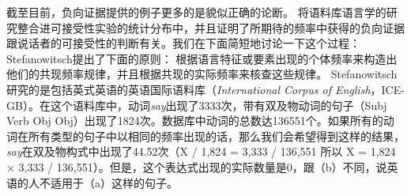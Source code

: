 截至目前，负向证据提供的例子更多的是貌似正确的论断。
\citet{Stefanowitsch2008a}将语料库语言学的研究整合进可接受性实验的统计分布中，并且证明了所期待的频率中获得的负向证据跟说话者的可接受性的判断有关。我们在下面简短地讨论一下这个过程：Stefanowitsch提出了下面的原则：
\ea
根据语言特征或要素出现的个体频率来构造出他们的共现频率规律，并且根据共现的实际频率来核查这些规律。\citep[]{Stefanowitsch2008a}
\z
Stefanowitsch研究的是包括英式英语的英语国际语料库（\emph{International Corpus of English}，ICE-GB）。在这个语料库中，动词\emph{say}出现了3333次，带有双及物动词的句子（Subj Verb Obj Obj）出现了1824次。数据库中动词的总数达136551个。如果所有的动词在所有类型的句子中以相同的频率出现的话，那么我们会希望得到这样的结果，\emph{say}在双及物构式中出现了44.52次（X / 1,824 = 3,333 / 136,551 所以 X = 1,824 $\times$ 3,333 / 136,551）。但是，这个表达式出现的实际数量是0，跟（b）不同，说英语的人不适用于（a）这样的句子。
\eal
{}
\zl

